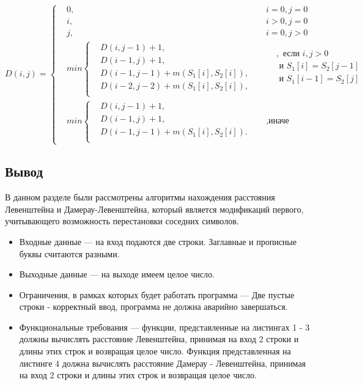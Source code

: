 \documentclass[14pt,russian]{scrartcl}
\begin{document}
\[ D(i, j) =  \left\{
	\begin{aligned}
		  & 0, &   & i = 0, j = 0 \\
		  & i, &   & i > 0, j = 0 \\
		  & j, &   & i = 0, j > 0 \\		    	
		&min \left\{
		\begin{aligned}
		&D(i, j - 1) + 1,\\
		&D(i - 1, j) + 1,\\
		&D(i - 1, j - 1) + m(S_{1}[i], S_{2}[i]), \\
		&D(i - 2, j - 2) + m(S_{1}[i], S_{2}[i]),\\
	\end{aligned} \right.
	&& 
	\begin{aligned}
		  & , \text{ если } i, j > 0         \\
		  & \text{ и } S_{1}[i] = S_{2}[j - 1]  \\
		  & \text{ и } S_{1}[i - 1] =  S_{2}[j] \\
	\end{aligned} \\ 
	&min \left\{
	\begin{aligned}
		  & D(i, j - 1) + 1,                         \\
		  & D(i - 1, j) + 1,                         \\
		  & D(i - 1, j - 1) + m(S_{1}[i], S_{2}[i]). \\
	\end{aligned} \right.  &&, \text{иначе}
	\end{aligned} \right.
\]	
	    
\subsection{Вывод}

В данном разделе были рассмотрены алгоритмы нахождения расстояния Левенштейна и Дамерау-Левенштейна, который является модификаций первого, учитывающего возможность перестановки соседних символов. 
\begin{itemize}
	\item Входные данные — на вход подаются две строки. Заглавные и прописные буквы считаются разными.
	\item Выходные данные — на выходе имеем целое число.
	\item Ограничения, в рамках которых будет работать программа — Две пустые строки - корректный ввод, программа не должна аварийно завершаться.
	\item Функциональные требования — функции, представленные на листингах 1 - 3 должны вычислять расстояние Левенштейна, принимая на вход 2 строки и длины этих строк и возвращая целое число. Функция представленная на листинге 4 должна вычислять расстояние Дамерау - Левенштейна, принимая на вход 2 строки и длины этих строк и возвращая целое число.
\end{itemize}
		
\end{document}
